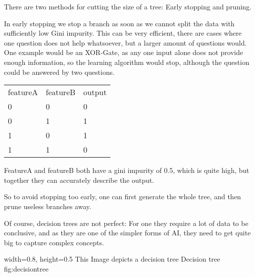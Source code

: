 There are two methods for cutting the size of a tree: Early stopping and pruning. 

In early stopping we stop a branch as soon as we cannot split the data with sufficiently low Gini impurity. This can be very efficient, there are cases where one question does not help whatsoever, but a larger amount of questions would. One example would be an XOR-Gate, as any one input alone does not provide enough information, so the learning algorithm would stop, although the question could be answered by two questions.

\begin{tabular}{p{} p{} p{}}
    featureA & featureB & output\\
    0 & 0 & 0 \\
    0 & 1 & 1 \\
    1 & 0 & 1 \\
    1 & 1 & 0 \\
\end{tabular}

FeatureA and featureB both have a gini impurity of 0.5, which is quite high, but together they can accurately describe the output.

So to avoid stopping too early, one can first generate the whole tree, and then prune useless branches away.

Of course, decision trees are not perfect: For one they require a lot of data to be conclusive, and as they are one of the simpler forms of AI, they need to get quite big to capture complex concepts.



    {width=0.8\textwidth, height=0.5\textheight} %
    {This Image depicts a decision tree}   %
    {Decision tree}   %
    {fig:decisiontree}    %

 